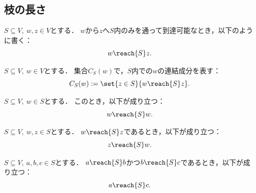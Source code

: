 \subsection{枝の長さ}

\begin{definition}
  \label{def:reachIn}
  \leanok
  $S \subseteq V,\ w, z \in V$とする．
  $w$から$z$へ$S$内のみを通って到達可能なとき，以下のように書く：
  \begin{equation}
    w \reach{S} z.
  \end{equation}
\end{definition}

\begin{definition}
  \label{def:compIn}
  \leanok
  $S \subseteq V,\ w \in V$とする．
  集合$C_S(w)$で，$S$内での$w$の連結成分を表す：
  \begin{equation}
    C_S(w) := \set{z \in S}{w \reach{S} z}.
  \end{equation}
\end{definition}

\begin{lemma}
  \label{lem:reachIn_refl}
  \leanok
  \uses{}
  $S \subseteq V,\ w \in S$とする．
  このとき，以下が成り立つ：
  \begin{equation}
    w \reach{S} w.
  \end{equation}
\end{lemma}

\begin{lemma}
  \label{lem:reachIn_symm}
  \leanok
  \uses{}
  $S \subseteq V,\ w, z \in S$とする．
  $w \reach{S} z$であるとき，以下が成り立つ：
  \begin{equation}
    z \reach{S} w.
  \end{equation}
\end{lemma}

\begin{lemma}
  \label{lem:reachIn_trans}
  \leanok
  \uses{}
  $S \subseteq V,\ a, b, c \in S$とする．
  $a \reach{S} b$かつ$b \reach{S} c$であるとき，以下が成り立つ：
  \begin{equation}
    a \reach{S} c.
  \end{equation}
\end{lemma}

